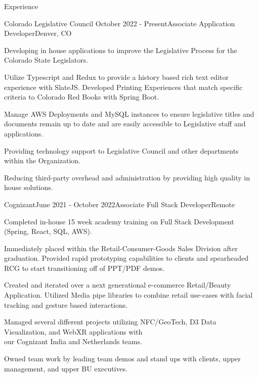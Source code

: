 \documentclass[
	11pt, %
]{resume} %
\begin{document}

\begin{rSection}{Experience}

	\begin{rSubsection}{Colorado Legislative Council }{October 2022 - Present}{Associate Application Developer}{Denver, CO}
		\item Developing in house applications to improve the Legislative Process for the Colorado State Legislators.
		\item Utilize Typescript and Redux to provide a history based rich text editor experience with SlateJS. Developed Printing Experiences that match specific criteria to Colorado Red Books with Spring Boot. 
		\item Manage AWS Deployments and MySQL instances to ensure legislative titles and documents remain up to date and are easily accessible to Legislative staff and applications.
		\item Providing technology support to Legislative Council and other departments within the Organization.
		\item Reducing third-party overhead and administration by providing high quality in house solutions.
	\end{rSubsection}


	\begin{rSubsection}{Cognizant}{June 2021 - October 2022}{Associate Full Stack Developer}{Remote}
		\item Completed in-house 15 week academy training on Full Stack Development (Spring, React, SQL, AWS).
		\item Immediately placed within the Retail-Consumer-Goods Sales Division after graduation. Provided rapid prototyping capabilities to clients and spearheaded RCG to start transitioning off of PPT/PDF demos.
		\item Created and iterated over a next generational e-commerce Retail/Beauty Application. Utilized Media pipe libraries to combine retail use-cases with facial tracking and gesture based interactions.
		\item Managed several different projects utilizing NFC/GeoTech, D3 Data Visualization, and WebXR applications with \\ our Cognizant India and Netherlands teams.
		\item Owned team work by leading team demos and stand ups with clients, upper management, and upper BU executives.
	\end{rSubsection}

\end{rSection}
\end{document}
